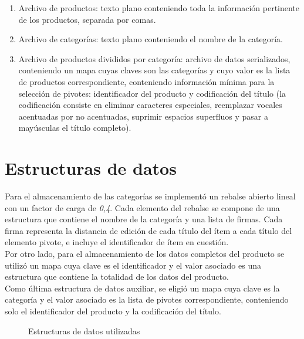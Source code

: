 \begin{enumerate}[1.]
\item  Archivo de productos: texto plano conteniendo toda la informaci\'on pertinente de los productos, separada por comas.
\item  Archivo de categor\'ias: texto plano conteniendo el nombre de la categor\'ia.
\item  Archivo de productos divididos por categor\'ia: archivo de datos serializados, conteniendo un mapa cuyas claves son las categor\'ias y cuyo valor es la lista de productos correspondiente, conteniendo informaci\'on m\'inima para la selecci\'on de pivotes: identificador del producto y codificaci\'on del t\'itulo (la codificaci\'on consiste en eliminar caracteres especiales, reemplazar vocales acentuadas por no acentuadas, suprimir espacios superfluos y pasar a may\'usculas el t\'itulo completo).
\end{enumerate}

\section{Estructuras de datos}

Para el almacenamiento de las categor\'ias se implement\'o un rebalse abierto lineal con un factor de carga de \textit{0,4}. Cada elemento del rebalse se compone de una estructura que contiene el nombre de la categor\'ia y una lista de firmas. Cada firma representa la distancia de edici\'on de cada t\'itulo del \'item a cada t\'itulo del elemento pivote, e incluye el identificador de \'item en cuesti\'on.\\

Por otro lado, para el almacenamiento de los datos completos del producto se utiliz\'o un mapa cuya clave es el identificador y el valor asociado es una estructura que contiene la totalidad de los datos del producto.\\

Como \'ultima estructura de datos auxiliar, se eligi\'o un mapa cuya clave es la categor\'ia y el valor asociado es la lista de pivotes correspondiente, conteniendo solo el identificador del producto y la codificaci\'on del t\'itulo.\\

\begin{figure}[H]
\centering
{}
    \caption{\small Estructuras de datos utilizadas}
    \label{fig:estructuras}
\end{figure}

